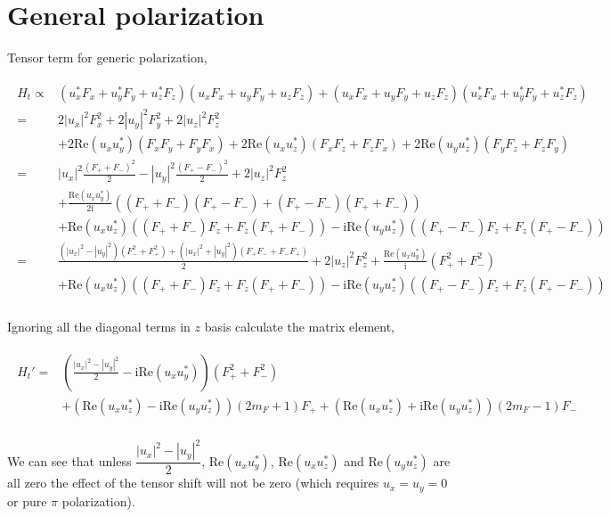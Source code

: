 \documentclass[10pt,fleqn]{article}
\newcommand{\ui}{\mathrm{i}}
\newcommand{\eqar}[1]
{
  \begin{align}
    #1
  \end{align}
}
\newcommand{\paren}[1]{{\left({#1}\right)}}
\newcommand{\abs}[1]{{\left|{#1}\right|}}
\begin{document}
\section{General polarization}
\label{general-pol}
Tensor term for generic polarization,
\eqar{
  \begin{split}
    H_t\propto&\paren{u_x^*F_x+u_y^*F_y+u_z^*F_z}\paren{u_xF_x+u_yF_y+u_zF_z}+\paren{u_xF_x+u_yF_y+u_zF_z}\paren{u_x^*F_x+u_y^*F_y+u_z^*F_z}\\
    =&2\abs{u_x}^2F_x^2+2\abs{u_y}^2F_y^2+2\abs{u_z}^2F_z^2\\
              &+2\mathrm{Re}\paren{u_xu_y^*}\paren{F_xF_y+F_yF_x}
                +2\mathrm{Re}\paren{u_xu_z^*}\paren{F_xF_z+F_zF_x}
                +2\mathrm{Re}\paren{u_yu_z^*}\paren{F_yF_z+F_zF_y}\\
    =&\abs{u_x}^2\frac{\paren{F_++F_-}^2}{2}-\abs{u_y}^2\frac{\paren{F_+-F_-}^2}{2}+2\abs{u_z}^2F_z^2\\
              &+\frac{\mathrm{Re}\paren{u_xu_y^*}}{2\ui}\paren{\paren{F_++F_-}\paren{F_+-F_-}+\paren{F_+-F_-}\paren{F_++F_-}}\\
              &+\mathrm{Re}\paren{u_xu_z^*}\paren{\paren{F_++F_-}F_z+F_z\paren{F_++F_-}}
                -\ui\mathrm{Re}\paren{u_yu_z^*}\paren{\paren{F_+-F_-}F_z+F_z\paren{F_+-F_-}}\\
    =&\frac{\paren{\abs{u_x}^2-\abs{u_y}^2}\paren{F_-^2+F_+^2}
       +\paren{\abs{u_x}^2+\abs{u_y}^2}\paren{F_+F_-+F_-F_+}}{2}+2\abs{u_z}^2F_z^2
       +\frac{\mathrm{Re}\paren{u_xu_y^*}}{\ui}\paren{F_+^2+F_-^2}\\
              &+\mathrm{Re}\paren{u_xu_z^*}\paren{\paren{F_++F_-}F_z+F_z\paren{F_++F_-}}
                -\ui\mathrm{Re}\paren{u_yu_z^*}\paren{\paren{F_+-F_-}F_z+F_z\paren{F_+-F_-}}\\
  \end{split}
}
Ignoring all the diagonal terms in $z$ basis calculate the matrix element,
\eqar{
  \begin{split}
    H_t'=&\paren{\frac{\abs{u_x}^2-\abs{u_y}^2}{2}
           -\ui\mathrm{Re}\paren{u_xu_y^*}}\paren{F_+^2+F_-^2}\\
         &+\paren{\mathrm{Re}\paren{u_xu_z^*}-\ui\mathrm{Re}\paren{u_yu_z^*}}\paren{2m_F+1}F_+
           +\paren{\mathrm{Re}\paren{u_xu_z^*}+\ui\mathrm{Re}\paren{u_yu_z^*}}\paren{2m_F-1}F_-\\
  \end{split}
}
We can see that unless $\dfrac{\abs{u_x}^2-\abs{u_y}^2}{2}$,
$\mathrm{Re}\paren{u_xu_y^*}$, $\mathrm{Re}\paren{u_xu_z^*}$ and
$\mathrm{Re}\paren{u_yu_z^*}$ are all zero the effect of
the tensor shift will not be zero (which requires $u_x=u_y=0$
or pure $\pi$ polarization).\\
\end{document}
